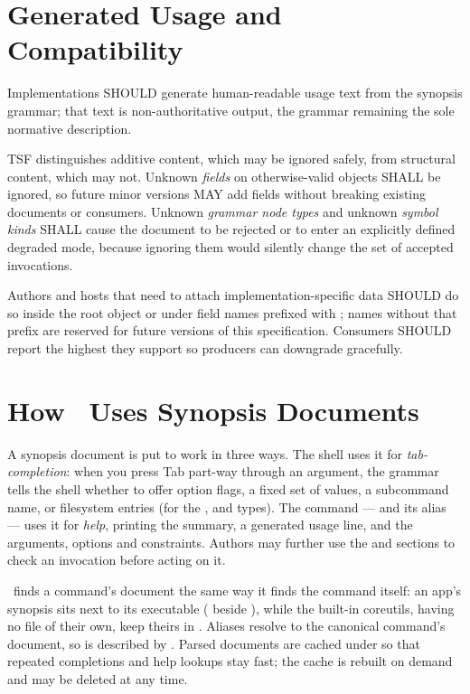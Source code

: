 \section{Generated Usage and Compatibility}

Implementations SHOULD generate human-readable usage text from the synopsis grammar; that text is non-authoritative output, the grammar remaining the sole normative description.

TSF distinguishes additive content, which may be ignored safely, from structural content, which may not. Unknown \emph{fields} on otherwise-valid objects SHALL be ignored, so future minor versions MAY add fields without breaking existing documents or consumers. Unknown \emph{grammar node types} and unknown \emph{symbol kinds} SHALL cause the document to be rejected or to enter an explicitly defined degraded mode, because ignoring them would silently change the set of accepted invocations.

Authors and hosts that need to attach implementation-specific data SHOULD do so inside the root  object or under field names prefixed with ; names without that prefix are reserved for future versions of this specification. Consumers SHOULD report the highest  they support so producers can downgrade gracefully.

\section{How \thedos\ Uses Synopsis Documents}

A synopsis document is put to work in three ways. The shell uses it for \emph{tab-completion}: when you press Tab part-way through an argument, the grammar tells the shell whether to offer option flags, a fixed set of  values, a subcommand name, or filesystem entries (for the ,  and  types). The  command --- and its  alias --- uses it for \emph{help}, printing the summary, a generated usage line, and the arguments, options and constraints. Authors may further use the  and  sections to check an invocation before acting on it.

\thedos\ finds a command's document the same way it finds the command itself: an app's synopsis sits next to its executable ( beside ), while the built-in coreutils, having no file of their own, keep theirs in . Aliases resolve to the canonical command's document, so  is described by . Parsed documents are cached under  so that repeated completions and help lookups stay fast; the cache is rebuilt on demand and may be deleted at any time.


